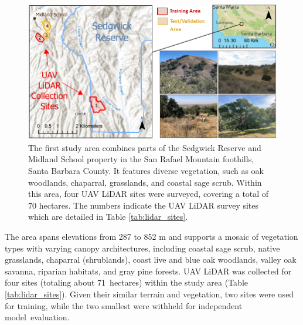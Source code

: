 \documentclass[remotesensing,article,accept,pdftex,moreauthors]{Definitions/mdpi}
\renewcommand{\hl}[1]{#1}
\begin{document}
\begin{figure}[H]
  \includegraphics[width=0.95\linewidth]{figures/Sedgwick_Reserve_Study_Area.png}
    \caption{\hl{The} %
 first study area combines parts of the Sedgwick Reserve and Midland School property in the San Rafael Mountain foothills, Santa Barbara County. It features diverse vegetation, such as oak woodlands, chaparral, grasslands, and coastal sage scrub. Within this area, four UAV LiDAR sites were surveyed, covering a total of 70 hectares. The numbers indicate the UAV LiDAR survey sites which are detailed in Table \ref{tab:lidar_sites}.}
  \label{fig:sedgwick_study_area}
\end{figure}

The area spans elevations from 287 to 852 m and supports a mosaic of vegetation types with varying canopy architectures, including coastal sage scrub, native grasslands, chaparral (shrublands), coast live and blue oak woodlands, valley oak savanna, riparian habitats, and gray pine forests. UAV LiDAR was collected for four sites (totaling about \mbox{71 hectares}) within the study area (Table \ref{tab:lidar_sites}). Given their similar terrain and vegetation, two sites were used for training, while the two smallest were withheld for independent \mbox{model evaluation}.


\end{document}
